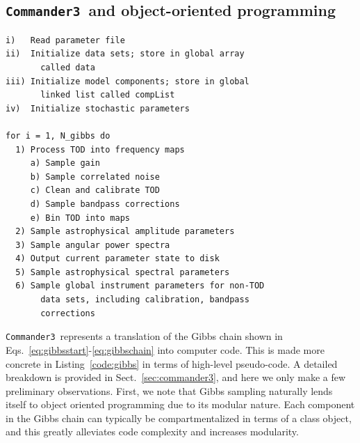 \documentclass[twocolumn]{aa}
\def\commander{\texttt{Commander}}
\def\commanderthree{\texttt{Commander3}}
\begin{document}

\subsection{\commanderthree\ and object-oriented programming}


\newcommand{\find}{\quad}
\newcommand{\ind}{\quad \;}
\begin{lstfloat}[t]
  {\scriptsize
    \begin{tcolorbox}
\begin{lstlisting}
i)   Read parameter file 
ii)  Initialize data sets; store in global array
       called data
iii) Initialize model components; store in global 
       linked list called compList
iv)  Initialize stochastic parameters 

for i = 1, N_gibbs do
  1) Process TOD into frequency maps
     a) Sample gain
     b) Sample correlated noise
     c) Clean and calibrate TOD
     d) Sample bandpass corrections
     e) Bin TOD into maps
  2) Sample astrophysical amplitude parameters
  3) Sample angular power spectra
  4) Output current parameter state to disk
  5) Sample astrophysical spectral parameters
  6) Sample global instrument parameters for non-TOD
       data sets, including calibration, bandpass
       corrections
\end{lstlisting}
    \end{tcolorbox}
}
\caption{Schematic overview of \commanderthree\ execution.}\label{code:gibbs}
\end{lstfloat}

\commanderthree\ represents a translation of the Gibbs chain shown in
Eqs.~\eqref{eq:gibbsstart}-\eqref{eq:gibbschain} into computer code. This is made more concrete
in Listing~\ref{code:gibbs} in terms of high-level pseudo-code. A
detailed breakdown is provided in Sect.~\ref{sec:commander3}, and here
we only make a few preliminary observations. First, we note that Gibbs
sampling naturally lends itself to object oriented programming due to
its modular nature. Each component in the Gibbs chain can typically be
compartmentalized in terms of a class object, and this greatly
alleviates code complexity and increases modularity.
\end{document}
